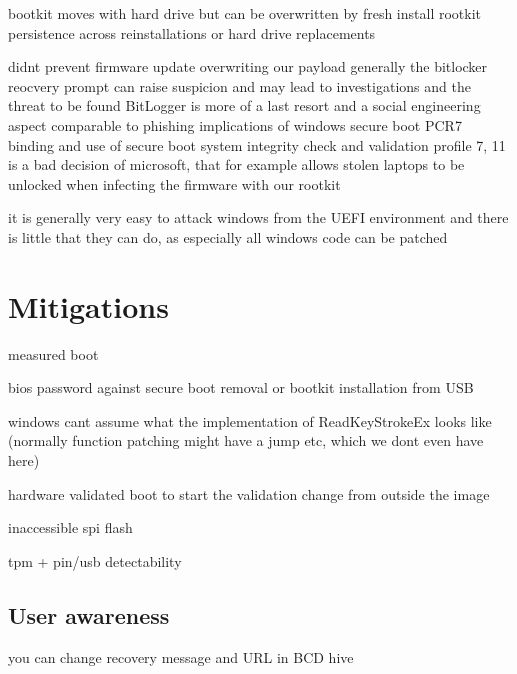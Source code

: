 bootkit moves with hard drive but can be overwritten by fresh install
rootkit persistence across reinstallations or hard drive replacements



didnt prevent firmware update overwriting our payload
generally the bitlocker reocvery prompt can raise suspicion and may lead to investigations and the threat to be found
BitLogger is more of a last resort and a social engineering aspect comparable to phishing
implications of windows secure boot PCR7 binding and use of secure boot system integrity check and validation profile 7, 11 is a bad decision of microsoft, that for example allows
stolen laptops to be unlocked when infecting the firmware with our rootkit


it is generally very easy to attack windows from the \ac{UEFI} environment and there is little that they can do, as especially all windows code can be patched


\section{Mitigations}

measured boot 

bios password against secure boot removal or bootkit installation from USB

windows cant assume what the implementation of ReadKeyStrokeEx looks like (normally function patching might have a jump etc, which we dont even have here)

hardware validated boot to start the validation change from outside the image

inaccessible spi flash

tpm + pin/usb detectability

\subsection{User awareness}

you can change recovery message and URL in BCD hive



